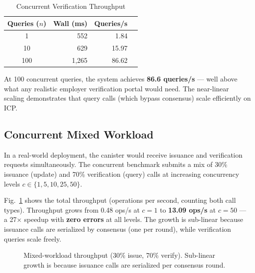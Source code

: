 \documentclass[journal]{IEEEtran}
\begin{document}
\begin{table}[t]
\caption{Concurrent Verification Throughput}
\label{tab:conc_verif}
\centering\small\renewcommand{\arraystretch}{1.1}
\begin{tabular}{@{}crrr@{}}
\toprule
\textbf{Queries ($n$)} & \textbf{Wall (ms)} & \textbf{Queries/s} \\
\midrule
1   & 552   & 1.84 \\
10  & 629   & 15.97 \\
100 & 1{,}265 & 86.62 \\
\bottomrule
\end{tabular}
\end{table}

At 100 concurrent queries, the system achieves \textbf{86.6 queries/s} — well above what any realistic employer verification portal would need. The near-linear scaling demonstrates that query calls (which bypass consensus) scale efficiently on ICP.

\subsection{Concurrent Mixed Workload}

In a real-world deployment, the canister would receive issuance and verification requests simultaneously. The concurrent benchmark submits a mix of 30\% issuance (update) and 70\% verification (query) calls at increasing concurrency levels $c \in \{1, 5, 10, 25, 50\}$.

Fig.~\ref{fig:conc_tput} shows the total throughput (operations per second, counting both call types). Throughput grows from 0.48 ops/s at $c = 1$ to \textbf{13.09 ops/s} at $c = 50$ — a 27$\times$ speedup with \textbf{zero errors} at all levels. The growth is sub-linear because issuance calls are serialized by consensus (one per round), while verification queries scale freely.

\begin{figure}[t]
\centering
{}
\caption{Mixed-workload throughput (30\% issue, 70\% verify). Sub-linear growth is because issuance calls are serialized per consensus round.}
\label{fig:conc_tput}
\end{figure}
\end{document}

